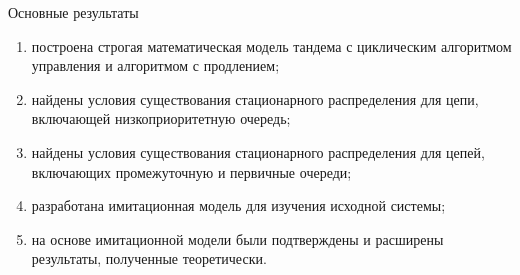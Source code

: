 \documentclass[10pt]{beamer}
\begin{document}
\begin{frame}{Основные результаты}
    \begin{enumerate}
        \item построена строгая математическая модель тандема с циклическим алгоритмом управления и алгоритмом с продлением;
        \item найдены условия существования стационарного распределения для цепи, включающей низкоприоритетную очередь;
        \item найдены условия существования стационарного распределения для цепей, включающих промежуточную и первичные очереди;
        \item разработана имитационная модель для изучения исходной системы;
        \item на основе имитационной модели были подтверждены и расширены результаты, полученные теоретически.
    \end{enumerate}
\end{frame}
\end{document}
